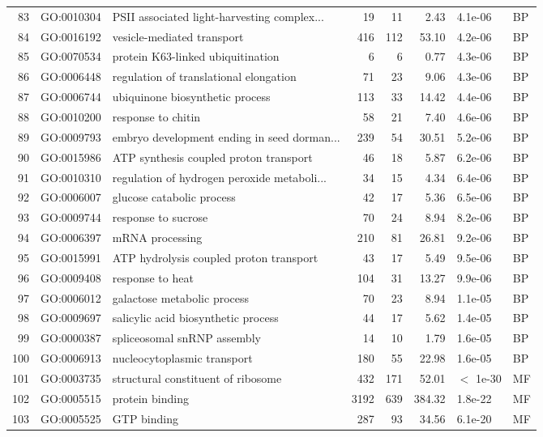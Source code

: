 \documentclass[12pt,oneside,a4paper]{article}
\begin{document}
\begin{longtable}{rllrrrll}
  83 & GO:0010304 & PSII associated light-harvesting complex... &  19 &  11 & 2.43 & 4.1e-06 & BP \\ 
  84 & GO:0016192 & vesicle-mediated transport & 416 & 112 & 53.10 & 4.2e-06 & BP \\ 
  85 & GO:0070534 & protein K63-linked ubiquitination &   6 &   6 & 0.77 & 4.3e-06 & BP \\ 
  86 & GO:0006448 & regulation of translational elongation &  71 &  23 & 9.06 & 4.3e-06 & BP \\ 
  87 & GO:0006744 & ubiquinone biosynthetic process & 113 &  33 & 14.42 & 4.4e-06 & BP \\ 
  88 & GO:0010200 & response to chitin &  58 &  21 & 7.40 & 4.6e-06 & BP \\ 
  89 & GO:0009793 & embryo development ending in seed dorman... & 239 &  54 & 30.51 & 5.2e-06 & BP \\ 
  90 & GO:0015986 & ATP synthesis coupled proton transport &  46 &  18 & 5.87 & 6.2e-06 & BP \\ 
  91 & GO:0010310 & regulation of hydrogen peroxide metaboli... &  34 &  15 & 4.34 & 6.4e-06 & BP \\ 
  92 & GO:0006007 & glucose catabolic process &  42 &  17 & 5.36 & 6.5e-06 & BP \\ 
  93 & GO:0009744 & response to sucrose &  70 &  24 & 8.94 & 8.2e-06 & BP \\ 
  94 & GO:0006397 & mRNA processing & 210 &  81 & 26.81 & 9.2e-06 & BP \\ 
  95 & GO:0015991 & ATP hydrolysis coupled proton transport &  43 &  17 & 5.49 & 9.5e-06 & BP \\ 
  96 & GO:0009408 & response to heat & 104 &  31 & 13.27 & 9.9e-06 & BP \\ 
  97 & GO:0006012 & galactose metabolic process &  70 &  23 & 8.94 & 1.1e-05 & BP \\ 
  98 & GO:0009697 & salicylic acid biosynthetic process &  44 &  17 & 5.62 & 1.4e-05 & BP \\ 
  99 & GO:0000387 & spliceosomal snRNP assembly &  14 &  10 & 1.79 & 1.6e-05 & BP \\ 
  100 & GO:0006913 & nucleocytoplasmic transport & 180 &  55 & 22.98 & 1.6e-05 & BP \\ 
  101 & GO:0003735 & structural constituent of ribosome & 432 & 171 & 52.01 & $<$ 1e-30 & MF \\ 
  102 & GO:0005515 & protein binding & 3192 & 639 & 384.32 & 1.8e-22 & MF \\ 
  103 & GO:0005525 & GTP binding & 287 &  93 & 34.56 & 6.1e-20 & MF \\ 

\end{longtable}
\end{document}
